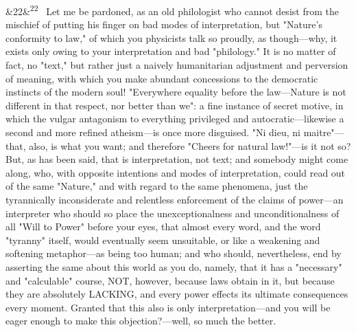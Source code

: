 \documentclass[12pt]{article}
\newcommand{\para}[1][]{\par\noindent\ifx&#1&\else\textsuperscript{\footnotesize #1}~\fi}
\begin{document}
\para[22] Let me be pardoned, as an old philologist who cannot desist from the mischief of putting his finger on bad modes of interpretation, but "Nature's conformity to law," of which you physicists talk so proudly, as though---why, it exists only owing to your interpretation and bad "philology." It is no matter of fact, no "text," but rather just a naively humanitarian adjustment and perversion of meaning, with which you make abundant concessions to the democratic instincts of the modern soul! "Everywhere equality before the law---Nature is not different in that respect, nor better than we": a fine instance of secret motive, in which the vulgar antagonism to everything privileged and autocratic---likewise a second and more refined atheism---is once more disguised. "Ni dieu, ni maitre"---that, also, is what you want; and therefore "Cheers for natural law!"---is it not so? But, as has been said, that is interpretation, not text; and somebody might come along, who, with opposite intentions and modes of interpretation, could read out of the same "Nature," and with regard to the same phenomena, just the tyrannically inconsiderate and relentless enforcement of the claims of power---an interpreter who should so place the unexceptionalness and unconditionalness of all "Will to Power" before your eyes, that almost every word, and the word "tyranny" itself, would eventually seem unsuitable, or like a weakening and softening metaphor---as being too human; and who should, nevertheless, end by asserting the same about this world as you do, namely, that it has a "necessary" and "calculable" course, NOT, however, because laws obtain in it, but because they are absolutely LACKING, and every power effects its ultimate consequences every moment. Granted that this also is only interpretation---and you will be eager enough to make this objection?---well, so much the better.
\end{document}
